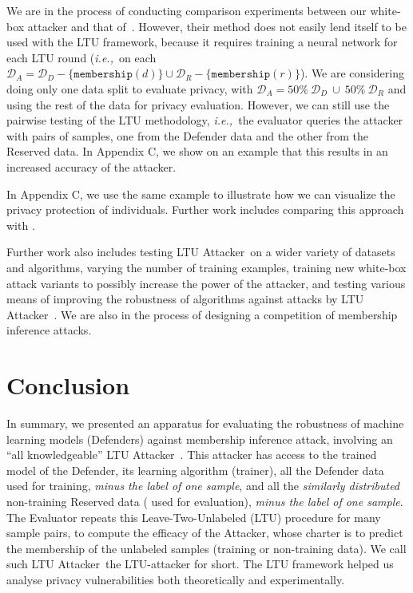 \documentclass[letterpaper]{article}
\newcommand{\sminus}{-}
\newcommand{\ie}{{\em i.e.,~}}
\newcommand{\oracle}{LTU Attacker~}
\begin{document}
We are in the process of conducting comparison experiments between our white-box attacker and that of~\cite{nasr2019comprehensive}. However, their method does not easily lend itself to be used with the LTU framework, because it requires training a neural network for each LTU round (\ie on each $\mathcal{D}_A=\mathcal{D}_D\sminus\{\texttt{membership}(d)\} \cup \mathcal{D}_R\sminus\{\texttt{membership}(r)\}$). We are considering doing only one data split to evaluate privacy, with $\mathcal{D}_A=50\%~ \mathcal{D}_D~\cup~50\%~\mathcal{D}_R$ and using the rest of the data for privacy evaluation. However, we can still use the pairwise testing of the LTU methodology, \ie the evaluator queries the attacker with pairs of samples, one from the Defender data and the other from the Reserved data. In Appendix C, we show on an example that this results in an increased accuracy of the attacker.

In Appendix C, we use the same example to illustrate how we can visualize the privacy protection of individuals. Further work includes comparing this approach with
\cite{song2021systematic}.

Further work also includes testing \oracle on a wider variety of datasets and algorithms, varying the number of training examples, training new white-box attack variants to possibly increase the power of the attacker, and testing various means of improving the robustness of algorithms against attacks by \oracle. We are also in the process of designing a competition of membership inference attacks.



\section{Conclusion}
In summary, we presented an apparatus for evaluating the robustness of machine learning models (Defenders) against membership inference attack, involving an ``all knowledgeable'' \oracle. This attacker
has access to the trained model of the Defender, its learning algorithm (trainer), all the Defender data used %
for training, {\em minus the label of one sample}, and all the {\em similarly distributed} non-training Reserved data (%
used for evaluation), {\em minus the label of one sample}. The Evaluator repeats this Leave-Two-Unlabeled (LTU) procedure for many sample pairs, to compute the efficacy of the Attacker, whose charter is to predict the membership of the unlabeled samples (training or non-training data). We call such \oracle the LTU-attacker for short. The LTU framework helped us analyse privacy vulnerabilities both theoretically and experimentally.
\end{document}
